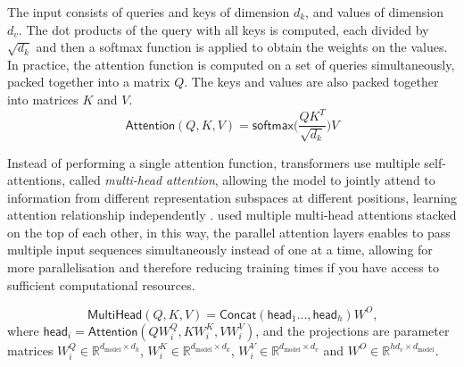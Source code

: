 \documentclass{article}
\begin{document}
	The input consists of queries and keys of dimension $d_k$, and values of dimension $d_v$. The dot 
	products of the query with all keys is computed, each divided by $\sqrt{d_k}$ and then a 
	softmax function is applied to obtain the weights on the values.
	In practice, the attention function is computed on a set of queries simultaneously, packed together 
	into a matrix $Q$. The keys and values are also packed together into matrices $K$ and $V$. 
	\begin{equation}
		\label{eqn:attention}
		\mathsf{Attention}(Q, K, V) = \mathsf{softmax} \big( \frac{QK^T}{\sqrt{d_k}}\big)V
	\end{equation}
			
	Instead of performing a single attention function, transformers use multiple self-attentions, called 
	\textit{multi-head attention}, allowing the model to jointly attend to information from different 
	representation subspaces at different positions, learning attention relationship independently	
	\cite{vaswani2017attention}.
	\citet{vaswani2017attention} used multiple multi-head attentions stacked on the top of each other, 
	in this way, the parallel attention layers enables to pass multiple input sequences simultaneously 
	instead of one at a time, allowing for more parallelisation and therefore reducing training times if you 
	have access to sufficient computational resources.
	
	\begin{equation}
		\label{eqn:multihead}
		{\mathsf{MultiHead}(Q, K, V) = \mathsf{Concat}(\mathsf{head}_1 \dots, 
		\mathsf{head}_h) W^O }
		\mbox{,}
	\end{equation}
	where $ \mathsf{head}_i = \mathsf{Attention}(QW_i^Q, KW_i^K , VW_i^V)$, and the 
	projections are parameter matrices $W_i^Q \in \mathbb{R}^{d_{\text{model}}\times 
	d_k}$, %
	$W_i^K \in \mathbb{R}^{d_{\text{model}}\times d_k}$, $W_i^V \in 
	\mathbb{R}^{d_{\text{model}}\times d_v}$ and $W^O \in \mathbb{R}^{hd_v \times 
	d_{\text{model}}}$.
	
\end{document}
